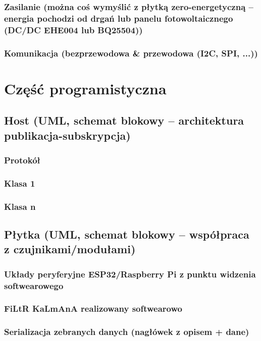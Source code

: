 			\subsubsection{Zasilanie (\footnotesize{można coś wymyślić z płytką zero-energetyczną -- energia pochodzi od drgań lub panelu fotowoltaicznego (DC/DC EHE004 lub BQ25504))}}
			\subsubsection{Komunikacja (bezprzewodowa \& przewodowa (I2C, SPI, ...))}
		
	
	\section{Część programistyczna}
		\subsection{Host (UML, schemat blokowy -- architektura publikacja-subskrypcja)}
			\subsubsection{Protokół}
			\subsubsection{Klasa 1}
			\subsubsection{Klasa n}
		
		\subsection{Płytka (UML, schemat blokowy -- współpraca z czujnikami/modułami)} 
			\subsubsection{Układy peryferyjne ESP32/Raspberry Pi z punktu widzenia softwearowego}
			\subsubsection{FiLtR KaLmAnA realizowany softwearowo}
			\subsubsection{Serializacja zebranych danych (nagłówek z opisem + dane)}
			

